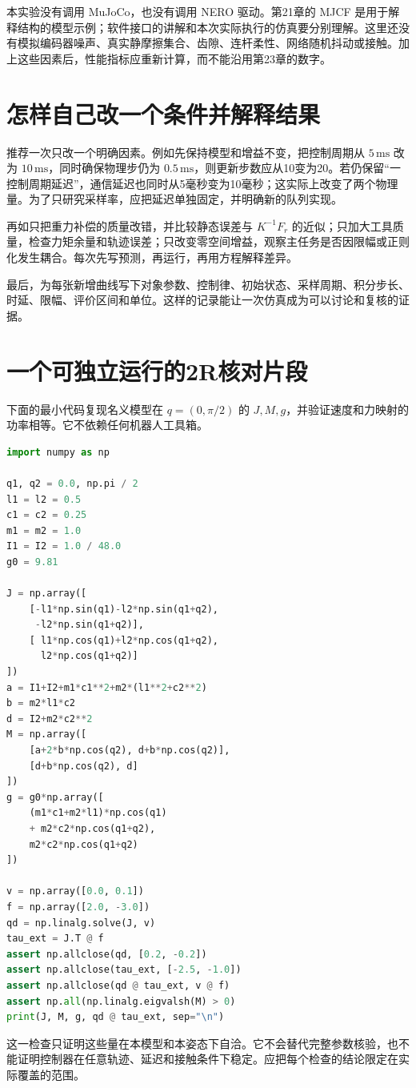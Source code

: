 本实验没有调用 MuJoCo，也没有调用 NERO 驱动。第21章的 MJCF 是用于解释结构的模型示例；软件接口的讲解和本次实际执行的仿真要分别理解。这里还没有模拟编码器噪声、真实静摩擦集合、齿隙、连杆柔性、网络随机抖动或接触。加上这些因素后，性能指标应重新计算，而不能沿用第23章的数字。

\section{怎样自己改一个条件并解释结果}

推荐一次只改一个明确因素。例如先保持模型和增益不变，把控制周期从 $5\,\mathrm{ms}$ 改为 $10\,\mathrm{ms}$，同时确保物理步仍为 $0.5\,\mathrm{ms}$，则更新步数应从10变为20。若仍保留“一控制周期延迟”，通信延迟也同时从5毫秒变为10毫秒；这实际上改变了两个物理量。为了只研究采样率，应把延迟单独固定，并明确新的队列实现。

再如只把重力补偿的质量改错，并比较静态误差与 $K^{-1}F_r$ 的近似；只加大工具质量，检查力矩余量和轨迹误差；只改变零空间增益，观察主任务是否因限幅或正则化发生耦合。每次先写预测，再运行，再用方程解释差异。

最后，为每张新增曲线写下对象参数、控制律、初始状态、采样周期、积分步长、时延、限幅、评价区间和单位。这样的记录能让一次仿真成为可以讨论和复核的证据。

\section{一个可独立运行的2R核对片段}

下面的最小代码复现名义模型在 $q=(0,\pi/2)$ 的 $J,M,g$，并验证速度和力映射的功率相等。它不依赖任何机器人工具箱。

\begingroup
{}
\begin{lstlisting}[language=Python]
import numpy as np

q1, q2 = 0.0, np.pi / 2
l1 = l2 = 0.5
c1 = c2 = 0.25
m1 = m2 = 1.0
I1 = I2 = 1.0 / 48.0
g0 = 9.81

J = np.array([
    [-l1*np.sin(q1)-l2*np.sin(q1+q2),
     -l2*np.sin(q1+q2)],
    [ l1*np.cos(q1)+l2*np.cos(q1+q2),
      l2*np.cos(q1+q2)]
])
a = I1+I2+m1*c1**2+m2*(l1**2+c2**2)
b = m2*l1*c2
d = I2+m2*c2**2
M = np.array([
    [a+2*b*np.cos(q2), d+b*np.cos(q2)],
    [d+b*np.cos(q2), d]
])
g = g0*np.array([
    (m1*c1+m2*l1)*np.cos(q1)
    + m2*c2*np.cos(q1+q2),
    m2*c2*np.cos(q1+q2)
])

v = np.array([0.0, 0.1])
f = np.array([2.0, -3.0])
qd = np.linalg.solve(J, v)
tau_ext = J.T @ f
assert np.allclose(qd, [0.2, -0.2])
assert np.allclose(tau_ext, [-2.5, -1.0])
assert np.allclose(qd @ tau_ext, v @ f)
assert np.all(np.linalg.eigvalsh(M) > 0)
print(J, M, g, qd @ tau_ext, sep="\n")
\end{lstlisting}
\endgroup

这一检查只证明这些量在本模型和本姿态下自洽。它不会替代完整参数核验，也不能证明控制器在任意轨迹、延迟和接触条件下稳定。应把每个检查的结论限定在实际覆盖的范围。
